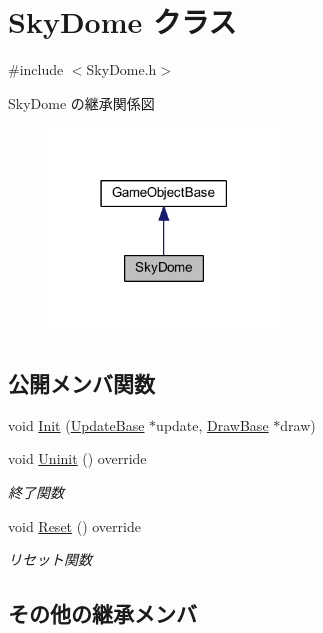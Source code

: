 \hypertarget{class_sky_dome}{}\section{Sky\+Dome クラス}
\label{class_sky_dome}


{\ttfamily \#include $<$Sky\+Dome.\+h$>$}



Sky\+Dome の継承関係図\nopagebreak
\begin{figure}[H]
\begin{center}
\leavevmode
\includegraphics[width=174pt]{class_sky_dome__inherit__graph}
\end{center}
\end{figure}
\subsection*{公開メンバ関数}
\begin{DoxyCompactItemize}
\item 
void \mbox{\hyperlink{class_sky_dome_a948e0e90cea46c78053ac55610812d6c}{Init}} (\mbox{\hyperlink{class_update_base}{Update\+Base}} $\ast$update, \mbox{\hyperlink{class_draw_base}{Draw\+Base}} $\ast$draw)
\item 
void \mbox{\hyperlink{class_sky_dome_a7fc71bfa671cf6e7ab26a194459b0753}{Uninit}} () override
\begin{DoxyCompactList}\small\item\em 終了関数 \end{DoxyCompactList}\item 
void \mbox{\hyperlink{class_sky_dome_abc6f8ed1471d7b03f25924a849cae590}{Reset}} () override
\begin{DoxyCompactList}\small\item\em リセット関数 \end{DoxyCompactList}\end{DoxyCompactItemize}
\subsection*{その他の継承メンバ}


